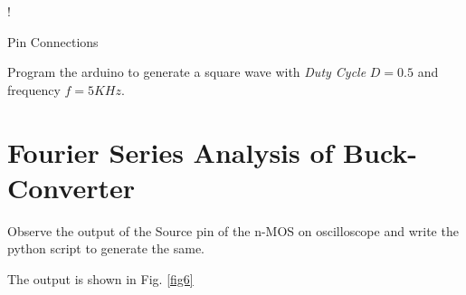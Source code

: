 \documentclass[journal,12pt,twocolumn]{IEEEtran}
\begin{document}
\begin{table}[!h]
\centering
\resizebox {\columnwidth} {!} {

}
\caption{Pin Connections} 
\label{table:connections}
\end{table}    
\begin{problem}
Program the arduino to generate a square wave with {\em Duty Cycle} $D=0.5$ and frequency $f=5KHz$.
\end{problem}
\solution
 
\section{Fourier Series Analysis of Buck-Converter}
\begin{problem}
Observe the output of the Source pin of the n-MOS on oscilloscope and write the python script to generate the same. 
\end{problem}
\solution The output is shown in Fig. \ref{fig6}
 
\end{document}
